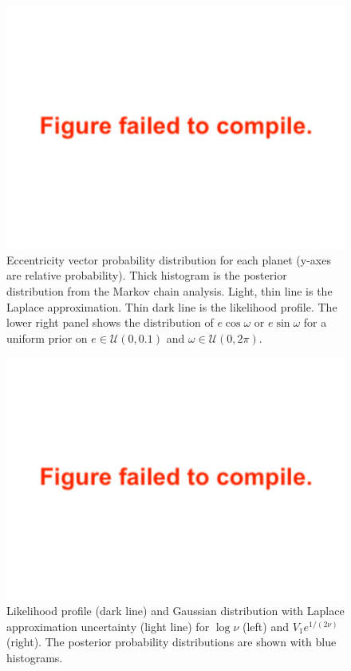 \documentclass[twocolumn]{aastex63}
\begin{document}
\begin{figure}
    \centering
    \includegraphics[width=\hsize]{figures/T1_eccentricity_vectors_likelihood_profile_hmc.pdf}
    {Eccentricity vector probability distribution for each planet (y-axes are relative probability).  Thick histogram is the posterior distribution from the Markov chain analysis.  Light, thin line is the Laplace approximation.  Thin dark line is the likelihood profile.  The lower right panel shows the distribution of
        $e\cos{\omega}$ or $e\sin{\omega}$ for a uniform prior on
        $e \in \mathcal{U}(0,0.1)$ and $\omega \in \mathcal{U}(0,2\pi)$.}
    \label{fig:ecc_likelihood_profile}
\end{figure}


\begin{figure}
    \centering
    \includegraphics[width=\columnwidth]{figures/T1_students_params_transformed.pdf}
    {Likelihood profile (dark line) and Gaussian distribution
        with Laplace approximation uncertainty (light line) for $\log{\nu}$ (left) and
        $V_1 e^{1/(2\nu)}$ (right).  The posterior probability distributions are shown with blue histograms.}
    \label{fig:student_param_likelihood_profile}
\end{figure}
\end{document}
